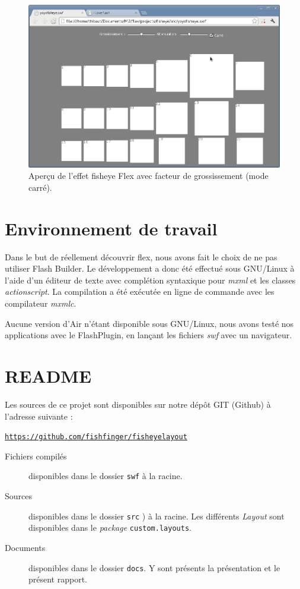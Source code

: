 \begin{minipage}[H]{.5\textwidth}
\begin{figure}[H]
  \centering
  \includegraphics[width=\textwidth]{../resources/illustrations/flex_screen_3}
  \caption{Aperçu de l'effet fisheye Flex avec facteur de grossissement (mode carré).}
  \label{fig:js_6}
\end{figure}
\end{minipage}

\section{Environnement de travail}

Dans le but de réellement découvrir flex, nous avons fait le choix de ne pas utiliser Flash Builder. Le développement a donc été effectué sous GNU/Linux à l'aide d'un éditeur de texte avec complétion syntaxique pour \emph{mxml} et les classes \emph{actionscript}. La compilation a été exécutée en ligne de commande avec les compilateur \emph{mxmlc}.

Aucune version d'Air n'étant disponible sous GNU/Linux, nous avons testé nos applications avec le FlashPlugin, en lançant les fichiers \emph{swf} avec un navigateur.

\section{README}

Les sources de ce projet sont disponibles sur notre dépôt GIT (Github) à l'adresse suivante :
\begin{center}
  \href{https://github.com/fishfinger/fisheyelayout}{\texttt{https://github.com/fishfinger/fisheyelayout}}
\end{center}

\begin{description}
  \item[Fichiers compilés] disponibles dans le dossier \texttt{swf} à la racine.
  \item[Sources] disponibles dans le dossier \texttt{src} ) à la racine. Les différents \emph{Layout} sont disponibles dans le \emph{package} \texttt{custom.layouts}.
  \item[Documents] disponibles dans le dossier \texttt{docs}. Y sont présents la présentation et le présent rapport.
\end{description}